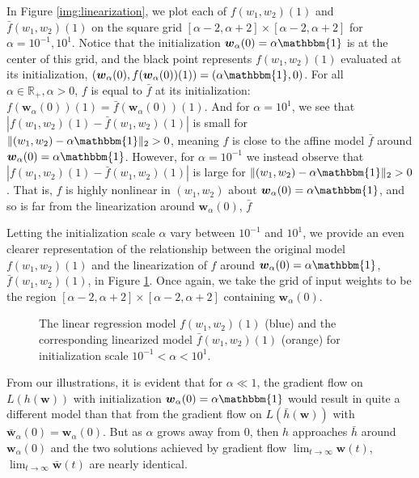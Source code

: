 \documentclass{article}
\begin{document}
In Figure \ref{img:linearization}, we plot each of $f(w_1, w_2)(1)$ and $\bar{f}(w_1, w_2)(1)$ on the square grid $[\alpha - 2, \alpha + 2] \times [\alpha - 2, \alpha + 2]$ for $\alpha = 10^{-1}, 10^1$. Notice that the initialization $\boldsymbol{w}_{\alpha}(0) = \alpha \mathbbm{1}$ is at the center of this grid, and the black point represents $f(w_1, w_2)(1)$ evaluated at its initialization, $(\boldsymbol{w}_{\alpha}(0), f(\boldsymbol{w}_{\alpha}(0))(1)) = (\alpha \mathbbm{1}, 0)$. For all $\alpha \in \mathbb{R}_+, \alpha > 0$, $f$ is equal to $\bar{f}$ at its initialization: $f(\boldsymbol{w}_{\alpha}(0))(1) = \bar{f}(\boldsymbol{w}_{\alpha}(0))(1)$. And for $\alpha = 10^1$, we see that $|f(w_1, w_2)(1) - \bar{f}(w_1, w_2)(1) |$ is small for $\| (w_1, w_2) - \alpha \mathbbm{1} \|_2 > 0$, meaning $f$ is close to the affine model $\bar{f}$ around $\boldsymbol{w}_{\alpha}(0) = \alpha \mathbbm{1}$. However, for $\alpha = 10^{-1}$ we instead observe that $|f(w_1, w_2)(1) - \bar{f}(w_1, w_2)(1)|$ is large for $\| (w_1, w_2) - \alpha \mathbbm{1} \|_2 > 0$. That is, $f$ is highly nonlinear in $(w_1, w_2)$ about $\boldsymbol{w}_{\alpha}(0) = \alpha \mathbbm{1}$, and so is far from the linearization around $\boldsymbol{w}_{\alpha}(0)$, $\bar{f}$

Letting the initialization scale $\alpha$ vary between $10^{-1}$ and $10^{1}$, we provide an even clearer representation of the relationship between the original model $f(w_1, w_2)(1)$ and the linearization of $f$ around $\boldsymbol{w}_{\alpha}(0) = \alpha \mathbbm{1}$, $\bar{f}(w_1, w_2)(1)$, in Figure \ref{gif:linearization}. Once again, we take the grid of input weights to be the region $[\alpha - 2, \alpha + 2] \times [\alpha - 2, \alpha + 2]$ containing $\boldsymbol{w}_{\alpha}(0)$.

\begin{figure}[H]
\caption{The linear regression model $f(w_1, w_2)(1)$ (blue) and the corresponding linearized model $\bar{f}(w_1, w_2)(1)$ (orange) for initialization scale $10^{-1} < \alpha < 10^1$.}\label{gif:linearization}
\end{figure}

From our illustrations, it is evident that for $\alpha \ll 1$, the gradient flow on $L(h(\boldsymbol{w}))$ with initialization $\boldsymbol{w}_{\alpha}(0) = \alpha \mathbbm{1}$ would result in quite a different model than that from the gradient flow on $L(\bar{h}(\boldsymbol{w}))$ with $\boldsymbol{\bar{w}}_{\alpha}(0) = \boldsymbol{w}_{\alpha}(0)$. But as $\alpha$ grows away from $0$, then $h$ approaches $\bar{h}$ around $\boldsymbol{w}_{\alpha}(0)$ and the two solutions achieved by gradient flow $\lim_{t \to \infty} \boldsymbol{w}(t)$,  $\lim_{t \to \infty} \boldsymbol{\bar{w}}(t)$ are nearly identical.
\end{document}
